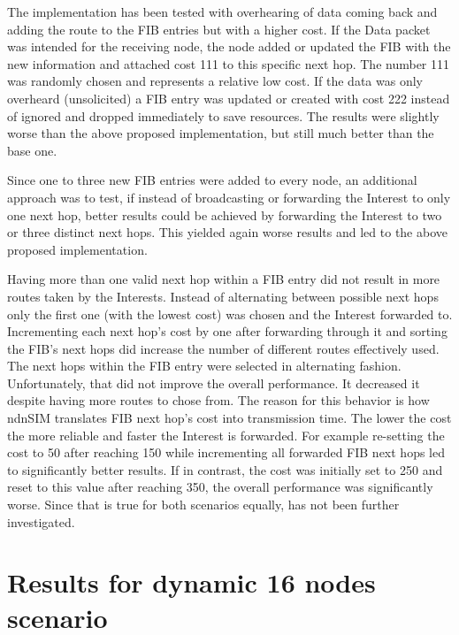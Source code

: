 The implementation has been tested with overhearing of data coming back and adding the route to the FIB entries but with a higher cost. If the Data packet was intended for the receiving node, the node added or updated the FIB with the new information and attached cost 111 to this specific next hop. The number 111 was randomly chosen and represents a relative low cost. If the data was only overheard (unsolicited) a FIB entry was updated or created with cost 222 instead of ignored and dropped immediately to save resources. The results were slightly worse than the above proposed implementation, but still much better than the base one.

\vspace{5mm} %

Since one to three new FIB entries were added to every node, an additional approach was to test, if instead of broadcasting or forwarding the Interest to only one next hop, better results could be achieved by forwarding the Interest to two or three distinct next hops. This yielded again worse results and led to the above proposed implementation.

\vspace{5mm} %

Having more than one valid next hop within a FIB entry did not result in more routes taken by the Interests. Instead of alternating between possible next hops only the first one (with the lowest cost) was chosen and the Interest forwarded to. Incrementing each next hop's cost by one after forwarding through it and sorting the FIB's next hops did increase the number of different routes effectively used. The next hops within the FIB entry were selected in alternating fashion. Unfortunately, that did not improve the overall performance. It decreased it despite having more routes to chose from. The reason for this behavior is how ndnSIM translates FIB next hop's cost into transmission time. The lower the cost the more reliable and faster the Interest is forwarded. For example re-setting the cost to 50 after reaching 150 while incrementing all forwarded FIB next hops led to significantly better results. If in contrast, the cost was initially set to 250 and reset to this value after reaching 350, the overall performance was significantly worse. Since that is true for both scenarios equally, has not been further investigated.

\section{Results for dynamic 16 nodes scenario}

